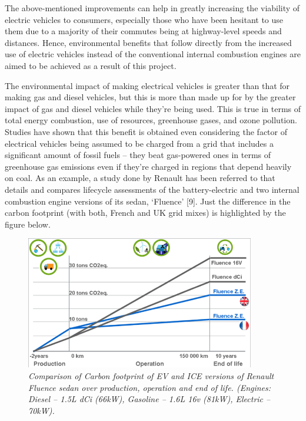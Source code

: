 \documentclass{article}
\begin{document}
\begin{flushleft}
The above-mentioned improvements can help in greatly increasing the viability of electric vehicles to consumers, especially those who have been hesitant to use them due to a majority of their commutes being at highway-level speeds and distances. Hence, environmental benefits that follow directly from the increased use of electric vehicles instead of the conventional internal combustion engines are aimed to be achieved as a result of this project.
\end{flushleft}

\begin{flushleft}
The environmental impact of making electrical vehicles is greater than that for making gas and diesel vehicles, but this is more than made up for by the greater impact of gas and diesel vehicles while they’re being used. This is true in terms of total energy combustion, use of resources, greenhouse gases, and ozone pollution. Studies have shown that this benefit is obtained even considering the factor of electrical vehicles being assumed to be charged from a grid that includes a significant amount of fossil fuels – they beat gas-powered ones in terms of greenhouse gas emissions even if they’re charged in regions that depend heavily on coal. As an example, a study done by Renault has been referred to that details and compares lifecycle assessments of the battery-electric and two internal combustion engine versions of its sedan, ‘Fluence’ [9]. Just the difference in the carbon footprint (with both, French and UK grid mixes) is highlighted by the figure below.
\end{flushleft}

\begin{figure}[!ht]
\centering 
\includegraphics[width=10cm]{fig_11.png}
\caption{\small \sl Comparison of Carbon footprint of EV and ICE versions of Renault Fluence sedan over production, operation and end of life. (Engines: Diesel – 1.5L dCi (66kW), Gasoline – 1.6L 16v (81kW), Electric – 70kW).}  
\end{figure}
\end{document}
